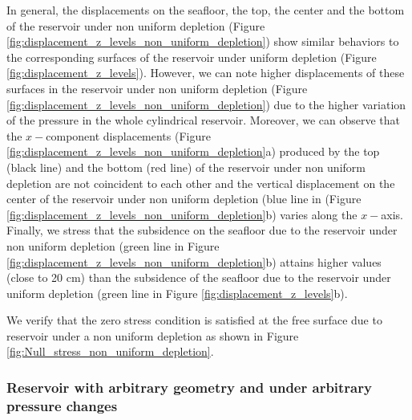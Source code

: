 \documentclass[journal abbreviation, manuscript]{copernicus}
\begin{document}
In general, the displacements on the seafloor, the top, the center and the bottom of the reservoir under non uniform depletion 
(Figure \ref{fig:displacement_z_levels_non_uniform_depletion}) show similar behaviors to the corresponding surfaces of the reservoir under uniform depletion 
(Figure \ref{fig:displacement_z_levels}).
However, we can note higher displacements of  these surfaces in the reservoir under non uniform depletion (Figure \ref{fig:displacement_z_levels_non_uniform_depletion}) due to the higher variation of the pressure in the whole cylindrical reservoir.
Moreover, we can observe that the $x-$component displacements
(Figure \ref{fig:displacement_z_levels_non_uniform_depletion}a)
produced by the top (black line) and the bottom (red line) of the reservoir under non uniform depletion are not coincident to each other and the vertical displacement on the center of the reservoir under non uniform depletion (blue line in (Figure \ref{fig:displacement_z_levels_non_uniform_depletion}b) varies along the $x-$axis.
Finally, we stress that the subsidence on the seafloor due to the reservoir under non uniform depletion 
(green line in Figure  \ref{fig:displacement_z_levels_non_uniform_depletion}b) attains higher values (close to 20 cm) than the subsidence of the seafloor due to the reservoir under uniform depletion (green line in Figure  \ref{fig:displacement_z_levels}b).

We verify that the zero stress condition is satisfied at the free surface 
due to reservoir under a non uniform depletion as shown in Figure \ref{fig:Null_stress_non_uniform_depletion}.

\subsubsection{Reservoir with arbitrary geometry and under arbitrary pressure changes}
\end{document}
